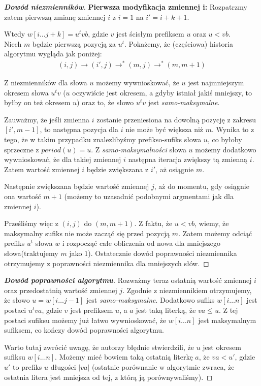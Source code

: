 \documentclass{article}
\begin{document}
\begin{proof}[\textbf{Dowód niezmienników}]
\vspace{5pt}

\textbf{Pierwsza modyfikacja zmiennej i:} Rozpatrzmy zatem pierwszą zmianę zmiennej $i$ z $i=1$ na $i' = i + k + 1$. 

Wtedy $w[i\ldots j+k] = u^t vb$, gdzie $v$ jest ścisłym prefiksem $u$ oraz $u < vb$.\\
Niech $m$ będzie pierwszą pozycją za $u^t$. Pokażemy, że (częściowa) historia algorytmu wygląda jak poniżej:
\begin{align*}
    (i, j) \rightarrow (i', j) \rightarrow^{*} (m, j) \rightarrow^{*}(m, m+1)
\end{align*}

Z niezmienników dla słowa $u$ możemy wywnioskować, że $u$ jest najmniejszym okresem słowa $u^tv$ ($u$ oczywiście jest okresem, a gdyby istniał jakiś mniejszy, to byłby on też okresem $u$) 
oraz to, że słowo $u^tv$ jest \textit{samo-maksymalne}. 

Zauważmy, że jeśli zmienna $i$ zostanie przeniesiona na dowolną pozycję z zakresu $[i', m-1]$, to następna pozycja dla $i$ nie może być większa niż $m$.
Wynika to z tego, że w takim przypadku znalezlibyśmy prefikso-sufiks słowa $u$, co byłoby sprzeczne z
$period(u) = u$. Z \textit{samo-maksymalności} słowa $u$ możemy dodatkowo wywnioskować, że dla takiej zmiennej $i$
następna iteracja zwiększy tą zmienną $i$. Zatem wartość zmiennej $i$ będzie zwiększana z $i'$, aż osiągnie $m$.

Następnie zwiększana będzie wartość zmiennej $j$, aż do momentu, gdy osiągnie ona wartość $m+1$ (możemy to 
uzasadnić podobnymi argmentami jak dla zmiennej $i$). 

Prześliśmy więc z $(i, j)$ do $(m, m+1)$. Z faktu, że $u < vb$, wiemy, że maksymalny sufiks 
nie może zacząć się przed pozycją $m$. Zatem 
możemy odciąć prefiks $u^t$ słowa $w$ i rozpocząć całe obliczenia od nowa dla mniejszego słowa(traktujemy $m$ jako $1$).
Ostatecznie dowód poprawności niezmiennika otrzymujemy z poprawności niezmiennika dla mniejszych słów.
\end{proof}

\begin{proof}[\textbf{Dowód poprawności algorytmu}]
Rozważmy teraz ostatnią wartość zmiennej $i$ oraz przedostatnią wartość zmiennej $j$.
Zgodnie z niezmiennikiem otrzymujemy, że słowo $u = w[i\ldots j-1]$ jest \textit{samo-maksymalne}.
Dodatkowo sufiks $w[i\ldots n]$ jest postaci $u^tva$, gdzie $v$ jest prefiksem $u$, a $a$ jest taką literką, że $va \leq u$. 
Z tej postaci sufiksu możemy już łatwo wywnioskować, że $w[i\ldots n]$  jest maksymalnym sufiksem, co kończy dowód poprawności algorytmu.

Warto tutaj zwrócić uwagę, że autorzy błędnie stwierdzili, że $u$ jest okresem sufiksu $w[i\ldots n]$. Możemy mieć bowiem
taką ostatnią literkę $a$, że $va < u'$, gdzie $u'$ to prefiks $u$ długości $|va|$ (ostatnie porównanie w algorytmie zwraca, że ostatnia litera jest mniejsza od tej, z którą ją porównywaliśmy).
\end{proof}
\end{document}
